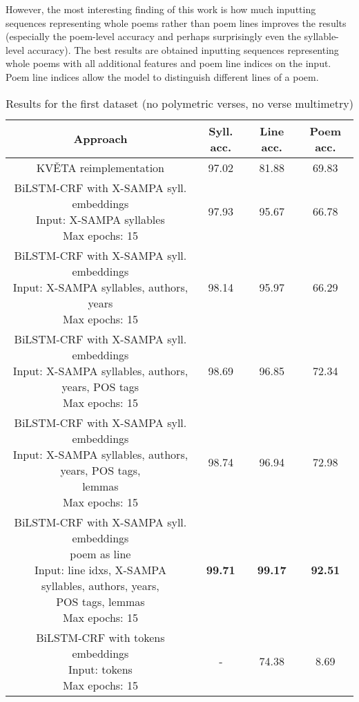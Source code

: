 However, the most interesting finding of this work is how much inputting sequences representing whole poems rather than poem lines improves the results (especially the poem-level accuracy and perhaps surprisingly even the syllable-level accuracy). The best results are obtained inputting sequences representing whole poems with all additional features and poem line indices on the input. Poem line indices allow the model to distinguish different lines of a poem.

\begin{table}[htpb]
\centering
\caption[Results for the first dataset]{Results for the first dataset (no polymetric verses, no verse multimetry)}\label{tab:results-data-set-0}
\begin{tabular}{|c||c|c|c|}\hline
    Approach & Syll. acc. & Line acc. & Poem acc.\\\hline\hline
    KVĚTA reimplementation & 97.02 & 81.88 & 69.83\\\hline
    \makecell{BiLSTM-CRF with X-SAMPA syll. embeddings\\Input: X-SAMPA syllables\\Max epochs: 15} & 97.93 & 95.67 & 66.78\\\hline
    \makecell{BiLSTM-CRF with X-SAMPA syll. embeddings\\Input: X-SAMPA syllables, authors, years\\Max epochs: 15} & 98.14 & 95.97 & 66.29\\\hline
    \makecell{BiLSTM-CRF with X-SAMPA syll. embeddings\\Input: X-SAMPA syllables, authors, years, POS tags\\Max epochs: 15} & 98.69 & 96.85 & 72.34\\\hline
    \makecell{BiLSTM-CRF with X-SAMPA syll. embeddings\\Input: X-SAMPA syllables, authors, years, POS tags,\\lemmas\\Max epochs: 15} & 98.74 & 96.94 & 72.98\\\hline
    \makecell{BiLSTM-CRF with X-SAMPA syll. embeddings\\poem as line\\Input: line idxs, X-SAMPA syllables, authors, years,\\POS tags, lemmas\\Max epochs: 15} & \textbf{99.71} & \textbf{99.17} & \textbf{92.51}\\\hline
    \makecell{BiLSTM-CRF with tokens embeddings\\Input: tokens\\Max epochs: 15} & - & 74.38 & 8.69\\\hline

\end{tabular}
\end{table}
